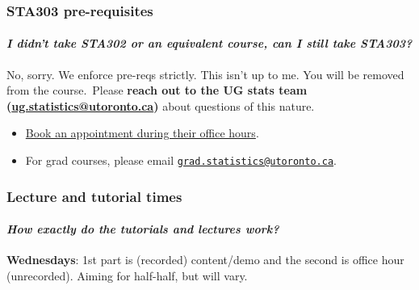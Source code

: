 \documentclass[
  openany]{book}
\begin{document}
\hypertarget{prereq-faq}{%
\subsubsection{STA303 pre-requisites}\label{prereq-faq}}

\hypertarget{i-didnt-take-sta302-or-an-equivalent-course-can-i-still-take-sta303}{%
\paragraph{\texorpdfstring{\emph{I didn't take STA302 or an equivalent course, can I still take STA303?}\\
}{I didn't take STA302 or an equivalent course, can I still take STA303? }}\label{i-didnt-take-sta302-or-an-equivalent-course-can-i-still-take-sta303}}

No, sorry. We enforce pre-reqs strictly. This isn't up to me. You will be removed from the course.~Please \textbf{reach out to the UG stats team (\url{ug.statistics@utoronto.ca})} about questions of this nature.

\begin{itemize}
\item
  \href{https://outlook.office365.com/owa/calendar/DepartmentofStatisticalSciencesUndergraduate@utoronto.onmicrosoft.com/bookings/}{Book an appointment during their office hours}.
\item
  For grad courses, please email \href{mailto:grad.statistics@utoronto.ca}{\nolinkurl{grad.statistics@utoronto.ca}}.
\end{itemize}

\hypertarget{lecture-and-tutorial-times}{%
\subsubsection{Lecture and tutorial times}\label{lecture-and-tutorial-times}}

\hypertarget{how-exactly-do-the-tutorials-and-lectures-work}{%
\paragraph{\texorpdfstring{\emph{How exactly do the tutorials and lectures work?}}{How exactly do the tutorials and lectures work?}}\label{how-exactly-do-the-tutorials-and-lectures-work}}

\textbf{Wednesdays}: 1st part is (recorded) content/demo and the second is office hour (unrecorded). Aiming for half-half, but will vary.
\end{document}
